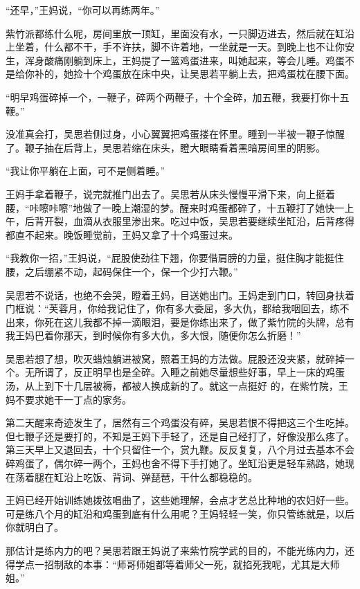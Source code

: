 “还早，”王妈说，“你可以再练两年。”

紫竹派都练什么呢，房间里放一顶缸，里面没有水，一只脚迈进去，然后就在缸沿上坐着，什么都不干，手不许扶，脚不许着地，一坐就是一天。到晚上也不让你安生，浑身酸痛刚躺到床上，王妈提了一篮鸡蛋进来，叫她起来，等会儿睡。鸡蛋不是给你补的，她捡十个鸡蛋放在床中央，让吴思若平躺上去，把鸡蛋枕在腰下面。

“明早鸡蛋碎掉一个，一鞭子，碎两个两鞭子，十个全碎，加五鞭，我要打你十五鞭。”

没准真会打，吴思若侧过身，小心翼翼把鸡蛋搂在怀里。睡到一半被一鞭子惊醒了。鞭子抽在后背上，吴思若缩在床头，瞪大眼睛看着黑暗房间里的阴影。

“我让你平躺在上面，可不是侧着睡。”

王妈手拿着鞭子，说完就推门出去了。吴思若从床头慢慢平滑下来，向上挺着腰，“咔嚓咔嚓”地做了一晚上潮湿的梦。醒来时鸡蛋都碎了，十五鞭打了她快一上午，后背开裂，血滴从衣服里渗出来。吃过中饭，吴思若要继续坐缸沿，后背疼得都直不起来。晚饭睡觉前，王妈又拿了十个鸡蛋过来。

“我教你一招，”王妈说，“屁股使劲往下翘，你要借肩膀的力量，挺住胸才能挺住腰，之后绷紧不动，起码保住一个，保一个少打六鞭。”

吴思若不说话，也绝不会哭，瞪着王妈，目送她出门。王妈走到门口，转回身扶着门框说：“芙蓉月，你给我记住了，你有多大委屈，多大仇，都给我咽回去，练不出来，你死在这儿我都不掉一滴眼泪，要是你练出来了，做了紫竹院的头牌，总有我王妈巴着你那天，到时候你有多大仇，多大恨，随便你怎么折磨！”

吴思若想了想，吹灭蜡烛躺进被窝，照着王妈的方法做。屁股还没夹紧，就碎掉一个。无所谓了，反正明早也是全碎。入睡之前她尽量想些好事，早上一床的鸡蛋汤，从上到下十几层被褥，都被人换成新的了。就这一点挺好
的，在紫竹院，王妈不要求她干一丁点的家务。

第二天醒来奇迹发生了，居然有三个鸡蛋没有碎，吴思若恨不得把这三个生吃掉。但七鞭子还是要打的，不知是王妈下手轻了，还是自己经打了，好像没那么疼了。第三天早上又退回去，十个只留住一个，赏九鞭。反反复复，八个月过去基本不会碎鸡蛋了，偶尔碎一两个，王妈也舍不得下手打她了。坐缸沿更是轻车熟路，她现在荡着腿在缸沿上吃饭、背词、弹琵琶，干什么都稳稳的。

王妈已经开始训练她拨弦唱曲了，这些她理解，会点才艺总比种地的农妇好一些。可是练八个月的缸沿和鸡蛋到底有什么用呢？王妈轻轻一笑，你只管练就是，以后你就明白了。

那估计是练内力的吧？吴思若跟王妈说了来紫竹院学武的目的，不能光练内力，还得学点一招制敌的本事：“师哥师姐都等着师父一死，就掐死我呢，尤其是大师姐。”

